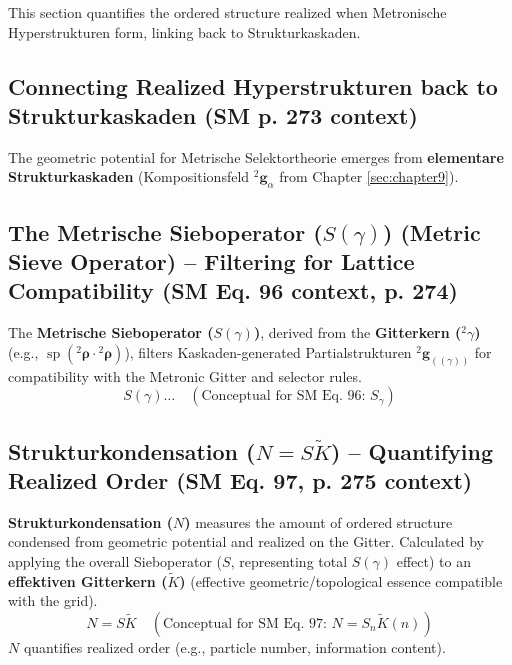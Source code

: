 \documentclass[
    12pt,              %
    a4paper,           %
    headings=normal,   %
    twoside=true,      %
    BCOR=8mm,          %
]{scrbook}
\DeclareMathOperator{\Sp}{sp}
\newcommand{\kompositionsfeld}{{}^2\mathbf{g}}
\newcommand{\partialstruktur}[1]{{}^2\mathbf{g}_{(#1)}}
\newcommand{\metronintegral}{S}
\newcommand{\metrischesieboperator}{S(\gamma)}
\begin{document}
This section quantifies the ordered structure realized when Metronische Hyperstrukturen form, linking back to Strukturkaskaden.

\subsection{Connecting Realized Hyperstrukturen back to Strukturkaskaden (SM p. 273 context)}
\label{sec:ch11_3_1_connecting_kaskaden}
The geometric potential for Metrische Selektortheorie emerges from \textbf{elementare Strukturkaskaden} (Kompositionsfeld \(\kompositionsfeld_\alpha\) from Chapter \ref{sec:chapter9}).

\subsection{The Metrische Sieboperator (\(\metrischesieboperator\)) (Metric Sieve Operator) – Filtering for Lattice Compatibility (SM Eq. 96 context, p. 274)}
\label{sec:ch11_3_2_sieboperator}
The \textbf{Metrische Sieboperator (\(\metrischesieboperator\))}, derived from the \textbf{Gitterkern (\({}^2\gamma\))} (e.g., \(\Sp({}^2\bm{\rho} \cdot {}^2\bm{\rho})\)), filters Kaskaden-generated Partialstrukturen \(\partialstruktur{(\gamma)}\) for compatibility with the Metronic Gitter and selector rules.
\begin{equation} \label{eq:original_sieboperator_placeholder} %
\metrischesieboperator \dots \quad (\text{Conceptual for SM Eq. 96: } S_{\gamma})
\end{equation}

\subsection{Strukturkondensation (\(N = S\tilde{K}\)) – Quantifying Realized Order (SM Eq. 97, p. 275 context)}
\label{sec:ch11_3_3_strukturkondensation_N_SK}
\textbf{Strukturkondensation (\(N\))} measures the amount of ordered structure condensed from geometric potential and realized on the Gitter. Calculated by applying the overall Sieboperator (\(\metronintegral\), representing total \(S(\gamma)\) effect) to an \textbf{effektiven Gitterkern (\(\tilde{K}\))} (effective geometric/topological essence compatible with the grid).
\begin{equation} \label{eq:original_strukturkondensation} %
N = \metronintegral\tilde{K} \quad (\text{Conceptual for SM Eq. 97: } N = S_n \tilde{K}(n))
\end{equation}
\(N\) quantifies realized order (e.g., particle number, information content).
\end{document}
